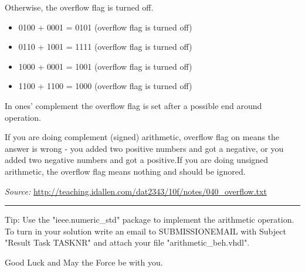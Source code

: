\documentclass[a4paper,12pt]{article}
\begin{document}
Otherwise, the overflow flag is turned off.
\begin{itemize}
\item 0100 + 0001 = 0101 (overflow flag is turned off)
\item 0110 + 1001 = 1111 (overflow flag is turned off)
\item 1000 + 0001 = 1001 (overflow flag is turned off)
\item 1100 + 1100 = 1000 (overflow flag is turned off)
\end{itemize}

In ones' complement the overflow flag is set after a possible end around operation.

If you are doing complement (signed) arithmetic, overflow flag on
means the answer is wrong - you added two positive numbers and got a
negative, or you added two negative numbers and got a positive.If you are doing unsigned arithmetic, the overflow flag means nothing
and should be ignored.

\vspace{0.5cm}
\textit{Source: }\url{http://teaching.idallen.com/dat2343/10f/notes/040_overflow.txt}
\\
\rule{16cm}{0.4pt}

\vspace{0.3cm}

Tip: Use the "ieee.numeric\_std" package to implement the arithmetic operation.
\\

To turn in your solution write an email to {{SUBMISSIONEMAIL}} with Subject "Result Task {{TASKNR}}" and attach your file "arithmetic\_beh.vhdl".

\vspace{0.7cm}
Good Luck and May the Force be with you.
\end{document}
